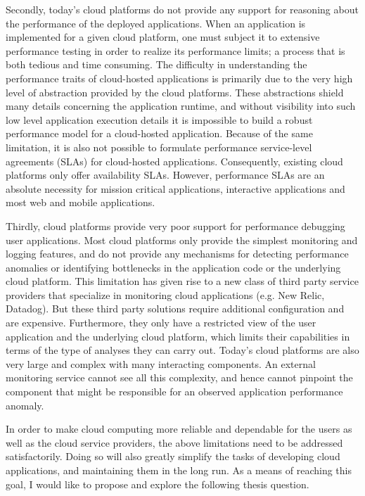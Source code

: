 Secondly, today's cloud platforms do not provide any support for reasoning about the 
performance of the deployed applications. When an application is implemented for
a given cloud platform, one must subject it to extensive performance testing in order
to realize its performance limits; a process that is both 
tedious and time consuming. The difficulty in understanding the performance 
traits of cloud-hosted applications is primarily due to the very high level of 
abstraction provided by the cloud platforms. These abstractions shield many details 
concerning the application runtime, and without visibility into such low level application 
execution details it is impossible
to build a robust performance model for a cloud-hosted application. Because of the same
limitation, it is also not possible to formulate performance service-level agreements (SLAs)
for cloud-hosted applications. Consequently, existing cloud platforms only offer
availability SLAs.  However, performance SLAs are an absolute necessity for
mission critical applications, interactive applications and most web and mobile applications.

Thirdly, cloud platforms provide very poor support for performance debugging
user applications. Most cloud platforms only provide the simplest monitoring and logging features,
and do not provide any mechanisms for detecting performance anomalies or identifying
bottlenecks in the application code or the underlying cloud platform. This limitation has given rise
to a new class of third party service providers that specialize in monitoring cloud applications
(e.g. New Relic, Datadog). But these third party solutions require additional configuration 
and are expensive.
Furthermore, they only have a restricted view of the user application and the underlying
cloud platform, which limits their capabilities in terms of the type of analyses they can carry out.
Today's cloud platforms are also very large and complex with many interacting components.
An external monitoring service cannot see all this complexity, and hence cannot pinpoint
the component that might be responsible for an observed application performance anomaly.

In order to make cloud computing more reliable and dependable for the users as well
as the cloud service providers, the above limitations need to be addressed satisfactorily.
Doing so will also greatly simplify the tasks of developing cloud applications, and maintaining 
them in the long run. As a means of reaching this goal, I would like to propose and explore the
following thesis question.

